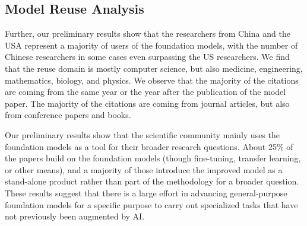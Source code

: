 \documentclass[acmsmall,authorversion]{acmart}
\begin{document}
\subsection{Model Reuse Analysis}

Further, our preliminary results show that the researchers from China and the USA represent a majority of users of the foundation models, with the number of Chinese researchers in some cases even surpassing the US researchers. We find that the reuse domain is mostly computer science, but also medicine, engineering, mathematics, biology, and physics. We observe that the majority of the citations are coming from the same year or the year after the publication of the model paper. The majority of the citations are coming from journal articles, but also from conference papers and books. 

Our preliminary results show that the scientific community mainly uses the foundation models as a tool for their broader research questions. About 25\% of the papers build on the foundation models (though fine-tuning, transfer learning, or other means), and a majority of those introduce the improved model as a stand-alone product rather than part of the methodology for a broader question. These results suggest that there is a large effort in advancing general-purpose foundation models for a specific purpose to carry out specialized tasks that have not previously been augmented by AI.



\end{document}
